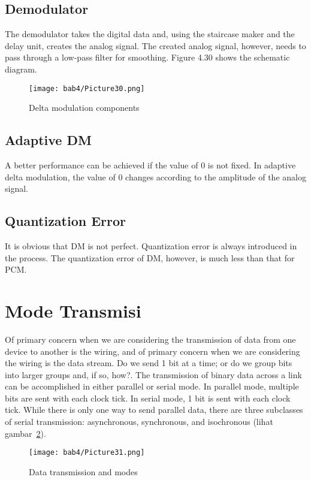 \subsection*{Demodulator}
The demodulator takes the digital data and, using the staircase maker and the delay unit, creates the analog signal. The created analog signal, however, needs to pass through a low-pass filter for smoothing. Figure 4.30 shows the schematic diagram.

\begin{figure}
  \centering
  \texttt{[image: bab4/Picture30.png]}
  \caption{Delta modulation components}
  \label{fig4:30}
\end{figure}

\subsection*{Adaptive DM}
A better performance can be achieved if the value of 0 is not fixed. In adaptive delta modulation, the value of 0 changes according to the amplitude of the analog signal.

\subsection*{Quantization Error}
It is obvious that DM is not perfect. Quantization error is always introduced in the process. The quantization error of DM, however, is much less than that for PCM.

\section{Mode Transmisi}
Of primary concern when we are considering the transmission of data from one device to another is the wiring, and of primary concern when we are considering the wiring is the data stream. Do we send 1 bit at a time; or do we group bits into larger groups and, if so, how?. The transmission of binary data across a link can be accomplished in either parallel or serial mode. In parallel mode, multiple bits are sent with each clock tick. In serial mode, 1 bit is sent with each clock tick. While there is only one way to send parallel data, there are three subclasses of serial transmission: asynchronous, synchronous, and isochronous (lihat gambar~\ref{fig4:31}).

\begin{figure}
  \centering
  \texttt{[image: bab4/Picture31.png]}
  \caption{Data transmission and modes}
  \label{fig4:31}
\end{figure}

